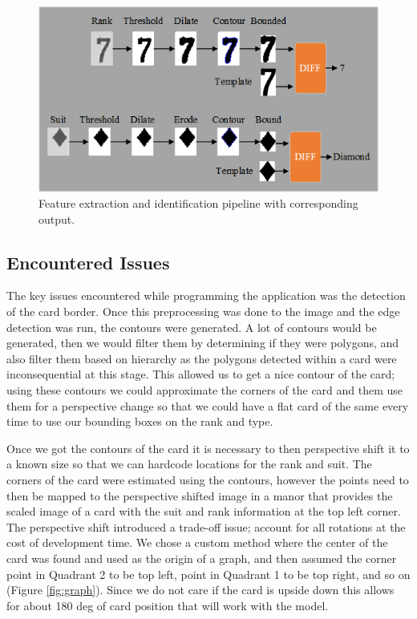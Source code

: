 \documentclass[conference]{IEEEtran}
\begin{document}
\begin{figure}[htbp]
\centerline{\includegraphics[width=\columnwidth]{PipelineExecFlowchart.png}}
\caption{Feature extraction and identification pipeline with corresponding output.}
\label{fig:feature-extraction-pipeline}
\end{figure}

\subsection{Encountered Issues}
The key issues encountered while programming the application was the detection of the card border.
Once this preprocessing was done to the image and the edge detection was run, the contours were
generated. A lot of contours would be generated, then we would filter them by determining if they
were polygons, and also filter them based on hierarchy as the polygons detected within a card were
inconsequential at this stage. This allowed us to get a nice contour of the card; using these
contours we could approximate the corners of the card and them use them for a perspective change so
that we could have a flat card of the same every time to use our bounding boxes on the rank and type.

Once we got the contours of the card it is necessary to then perspective shift it to a known size so
that we can hardcode locations for the rank and suit. The corners of the card were estimated using
the contours, however the points need to then be mapped to the perspective shifted image in a manor
that provides the scaled image of a card with the suit and rank information at the top left corner.
The perspective shift introduced a trade-off issue; account for all rotations at the cost of
development time. We chose a custom method where the center of the card was found and used as the
origin of a graph, and then assumed the corner point in Quadrant 2 to be top left, point in Quadrant
1 to be top right, and so on (Figure \ref{fig:graph}). Since we do not care if the card is upside
down this allows for about 180 deg of card position that will work with the model.
\end{document}
